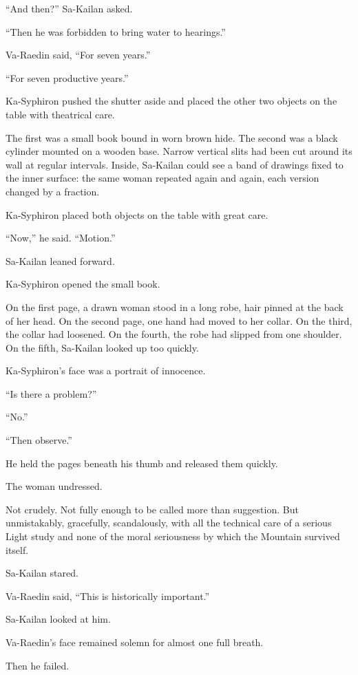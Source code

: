 “And then?” Sa-Kailan asked.\par
“Then he was forbidden to bring water to hearings.”\par
Va-Raedin said, “For seven years.”\par
“For seven productive years.”\par
Ka-Syphiron pushed the shutter aside and placed the other two objects on the table with theatrical care.\par
The first was a small book bound in worn brown hide. The second was a black cylinder mounted on a wooden base. Narrow vertical slits had been cut around its wall at regular intervals. Inside, Sa-Kailan could see a band of drawings fixed to the inner surface: the same woman repeated again and again, each version changed by a fraction.\par
Ka-Syphiron placed both objects on the table with great care.\par
“Now,” he said. “Motion.”\par
Sa-Kailan leaned forward.\par
Ka-Syphiron opened the small book.\par
On the first page, a drawn woman stood in a long robe, hair pinned at the back of her head. On the second page, one hand had moved to her collar. On the third, the collar had loosened. On the fourth, the robe had slipped from one shoulder. On the fifth, Sa-Kailan looked up too quickly.\par
Ka-Syphiron’s face was a portrait of innocence.\par
“Is there a problem?”\par
“No.”\par
“Then observe.”\par
He held the pages beneath his thumb and released them quickly.\par
The woman undressed.\par
Not crudely. Not fully enough to be called more than suggestion. But unmistakably, gracefully, scandalously, with all the technical care of a serious Light study and none of the moral seriousness by which the Mountain survived itself.\par
Sa-Kailan stared.\par
Va-Raedin said, “This is historically important.”\par
Sa-Kailan looked at him.\par
Va-Raedin’s face remained solemn for almost one full breath.\par
Then he failed.\par
